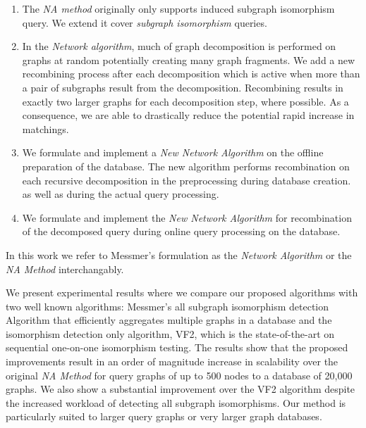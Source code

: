 \begin{enumerate}
\item The \textit{NA method} originally only supports induced subgraph isomorphism query. We extend it  cover \textit{subgraph isomorphism} queries.
\item  In the \textit{Network algorithm}, much of graph decomposition is performed on graphs at random potentially creating many graph fragments. We add a new recombining 
process after each decomposition which is active when more than a pair of  subgraphs result from the decomposition.  Recombining results in exactly  two larger 
graphs for each decomposition step, where possible.  As a consequence, we are able to drastically reduce the potential rapid increase in matchings. 
\item We formulate and implement  a  \textit{New  Network Algorithm} on the offline preparation of the database. The new algorithm performs recombination 
on  each recursive decomposition in the  preprocessing during database creation. as well as during the actual query processing. 
\item We formulate and implement the \textit{New  Network Algorithm} for recombination of the decomposed query during  online query processing on the database.
\end{enumerate}

In this work we refer to Messmer's formulation as the \textit{Network Algorithm} or the \textit{NA Method} interchangably.


We present experimental results where we compare our proposed algorithms with two well known algorithms: Messmer's\cite{messmer_bunke2000} all subgraph isomorphism 
detection Algorithm that efficiently aggregates multiple graphs in a database and the isomorphism detection only algorithm, VF2\cite{cordella2001_vf2}, which is the 
state-of-the-art on sequential one-on-one isomorphism testing. The results show that the proposed improvements result in an order of magnitude increase in scalability 
over the original \textit{NA Method}  for query graphs of up to 500 nodes to a database of 20,000 graphs. We also show a substantial improvement over the VF2 
algorithm despite the increased workload of detecting all subgraph isomorphisms. Our method is particularly suited to larger query graphs or very larger graph 
databases.
